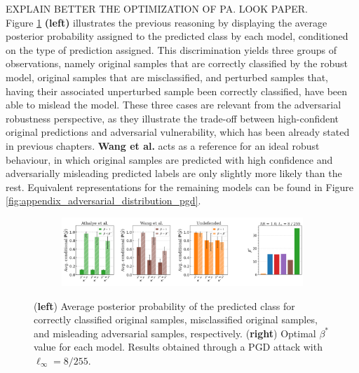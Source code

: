 EXPLAIN BETTER THE OPTIMIZATION OF PA. LOOK PAPER. \\

Figure \ref{fig:unrobust_posterior_short_pgd} \textbf{(left)} illustrates
the previous reasoning by displaying the average posterior
probability assigned to the predicted class by each model, conditioned on the type
of prediction assigned. This discrimination yields three groups of observations,
namely original samples that are correctly classified by the robust model, 
original samples that are misclassified, and perturbed samples that, having their 
associated unperturbed sample been correctly classified, 
have been able to mislead the model. These three cases are relevant from the 
adversarial robustness perspective,  as they illustrate the trade-off between high-confident 
original predictions and adversarial vulnerability, which has been already stated in 
previous chapters. {\color{tab:brown} \textbf{Wang et al.}}
acts as a reference for an ideal robust behaviour, in which original samples are
predicted with high confidence and adversarially misleading predicted labels are 
only slightly more likely than the rest. Equivalent representations for the remaining
models can be found in Figure \ref{fig:appendix_adversarial_distribution_pgd}.\\

\begin{figure}[H]
    \centering
    \begin{subfigure}[b]{\textwidth}
        \centering
        \includegraphics[width=\textwidth]{img/results_discussion/adversarial/bpda_wang_undefended_beta_pgd.png}
    \end{subfigure}
   
    \caption{(\textbf{left}) Average posterior probability of the predicted class for 
    correctly classified original samples, misclassified original samples, and 
    misleading adversarial samples, respectively. (\textbf{right}) Optimal $\beta^{*}$ value for each model.
    Results obtained through a PGD attack with $\ell_\infty = 8 / 255$.}
    \label{fig:unrobust_posterior_short_pgd}
\end{figure}

